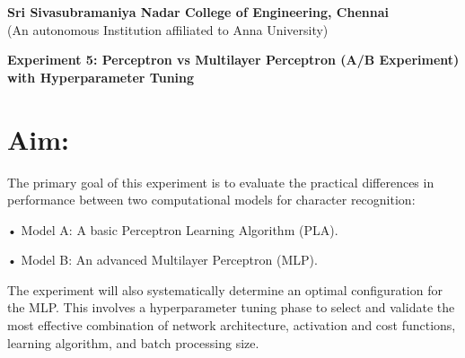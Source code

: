 \documentclass[11pt]{article}
\begin{document}
   \begin{center}
    \large \textbf{Sri Sivasubramaniya Nadar College of Engineering, Chennai} \\
    (An autonomous Institution affiliated to Anna University) \\
    \vspace{0.3cm}
\end{center}

\begin{table}[!h]
\renewcommand{\arraystretch}{1.5}
\end{table}

\vspace{0.5cm}

\begin{center}
 \textbf{Experiment 5: Perceptron vs Multilayer Perceptron (A/B Experiment) with Hyperparameter Tuning}
\end{center}

\vspace{0.4cm}
\noindent
\section{Aim:} 

The primary goal of this experiment is to evaluate the practical differences in performance between two computational models for character recognition:

 • Model A: A basic Perceptron Learning Algorithm (PLA).

 • Model B: An advanced Multilayer Perceptron (MLP).

The experiment will also systematically determine an optimal configuration for the MLP. This involves a hyperparameter tuning phase to select and validate the most effective combination of network architecture, activation and cost functions, learning algorithm, and batch processing size.
\end{document}
